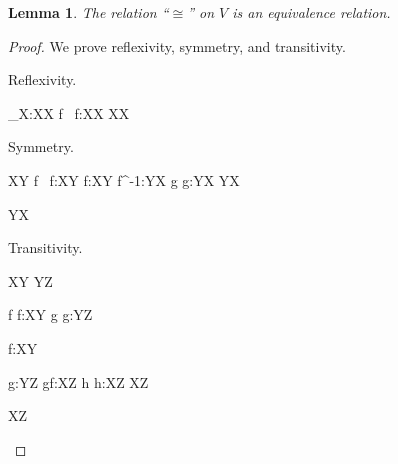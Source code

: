 \documentclass[10pt,a4paper]{book}
\newtheorem{lemma}{Lemma}[section]
\begin{document}
\begin{lemma}
    The relation ``$\cong$'' on $V$ is an equivalence relation.
\end{lemma}

\begin{proof}
    We prove reflexivity, symmetry, and transitivity.

    Reflexivity.


    \begin{fitchproof}[arrayenv=tabular]
         { _X:XX }
         { \exists f \ f:XX }
         { X\cong X }
    \end{fitchproof}

    Symmetry.


    \begin{fitchproof}[arrayenv=tabular]
         { X\cong Y }
         { \exists f \ f:XY }
        \open
         { f:XY }
         { f^{-1}:YX }
         { \exists g\; g:YX }
         { Y\cong X }
        \close

         { Y\cong X }


    \end{fitchproof}

    Transitivity.


    \begin{fitchproof}[arrayenv=tabular]
         { X\cong Y }
         { Y\cong Z }

         { \exists f\; f:XY }
         { \exists g\; g:YZ }

        \open
         { f:XY }

        \open
         { g:YZ }
         { g\circ f:XZ }
         { \exists h\; h:XZ }
         { X\cong Z }
        \close
        \close

         { X\cong Z }


    \end{fitchproof}
\end{proof}
\end{document}
